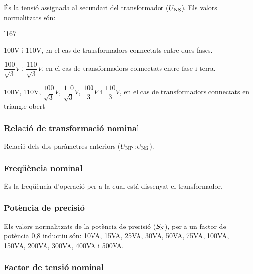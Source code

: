 \'{E}s la tensi\'{o} assignada al secundari del transformador ($U_\mathrm{NS}$).
Els valors normalitzats s\'{o}n:
\begin{dinglist}{'167}
    \item 100\unit{V} i 110\unit{V}, en el cas de transformadors connectats
    entre dues fases.
    \item $\dfrac{100}{\sqrt{3}}\unit{V}$ i
        $\dfrac{110}{\sqrt{3}}\unit{V}$, en el cas de transformadors
        connectats entre fase i terra.
    \item 100\unit{V}, 110\unit{V}, $\dfrac{100}{\sqrt{3}}\unit{V}$,
    $\dfrac{110}{\sqrt{3}}\unit{V}$, $\dfrac{100}{3}\unit{V}$   i
    $\dfrac{110}{3}\unit{V}$, en el cas de transformadors
    connectats en triangle obert.
\end{dinglist}

\subsubsection{Relaci\'{o} de transformaci\'{o} nominal}

 Relaci\'{o}  dels dos par\`{a}metres anteriors ($U_\mathrm{NP}\!:\!U_\mathrm{NS}$).

\subsubsection{Freq\"{u}\`{e}ncia nominal}

 \'{E}s la freq\"{u}\`{e}ncia d'operaci\'{o} per a la qual  est\`{a} dissenyat el transformador.

\subsubsection{Pot\`{e}ncia de precisi\'{o}}

Els valors normalitzats de la pot\`{e}ncia de precisi\'{o} ($S_\mathrm{N}$), per
a un factor de pot\`{e}ncia 0,8 inductiu s\'{o}n: 10\unit{VA}, 15\unit{VA},
25\unit{VA}, 30\unit{VA}, 50\unit{VA}, 75\unit{VA}, 100\unit{VA},
150\unit{VA}, 200\unit{VA}, 300\unit{VA}, 400\unit{VA} i
500\unit{VA}.

\subsubsection{Factor de tensi\'{o} nominal}

